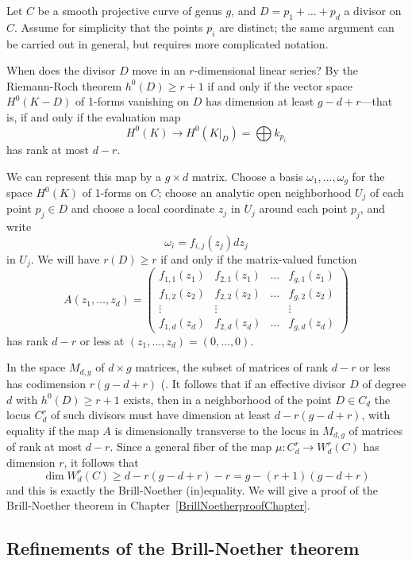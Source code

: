 Let $C$ be a smooth projective curve of genus $g$, and $D = p_1 + \dots + p_d$ a divisor on $C$. Assume for simplicity that  the points $p_i$ are distinct; the same argument  can be carried out in general, but requires more complicated notation.

When does the divisor $D$ move in an $r$-dimensional linear series? By the Riemann-Roch theorem $h^0(D) \geq r+1$ if and only if the vector space $H^0(K-D)$ of 1-forms vanishing on $D$ has dimension at least $g-d+r$---that is, if and only if the  evaluation map
$$
H^0(K) \to H^0(K|_D) = \bigoplus k_{p_i}
$$
has rank at most $d-r$. 

We can represent this map by a $g \times d$ matrix. Choose a basis $\omega_1,\dots,\omega_g$ for the space $H^0(K)$ of 1-forms on $C$; choose an analytic open neighborhood $U_j$ of each point $p_j \in D$ and choose a local coordinate $z_j$ in $U_j$ around each point $p_j$, and write
$$
\omega_i = f_{i,j}(z_j)dz_j
$$
in $U_j$. We will have $r(D) \geq r$ if and only if the  matrix-valued function
$$
A(z_1,\dots,z_d) = 
\begin{pmatrix}
f_{1,1}(z_1) & f_{2,1}(z_1) & \dots & f_{g,1}(z_1) \\
f_{1,2}(z_2) & f_{2,2}(z_2) & \dots & f_{g,2}(z_2) \\
\vdots & \vdots &  & \vdots \\
f_{1,d}(z_d) & f_{2,d}(z_d) & \dots & f_{g,d} (z_d)
\end{pmatrix}
$$
has rank $d-r$ or less at $(z_1,\dots,z_d) = (0,\dots,0)$.


In the space $M_{d,g}$ of $d \times g$ matrices, the subset of matrices of rank $d-r$ or less has codimension $r(g-d+r)$ (\cite[Exercise 10.9]{Eisenbud1995}. 
It follows 
that if  an effective divisor $D$ of degree $d$ with $h^0(D) \geq r+1$ exists, then in a neighborhood of the point $D \in C_d$ the locus $C^r_d$ of such divisors must have dimension at least $d - r(g-d+r)$, with equality if the map $A$ is dimensionally transverse to the locus in $M_{d,g}$ of matrices of rank at most $d-r$. Since a general fiber of the map $\mu : C^r_d \to W^r_d(C)$ has dimension $r$, it follows that 
$$
\dim W^r_d(C) \geq d - r(g-d+r) - r = g - (r+1)(g-d+r)
$$
and this is exactly the  Brill-Noether (in)equality. We will give a proof of the Brill-Noether theorem in Chapter~\ref{BrillNoetherproofChapter}.


\subsection{Refinements of the Brill-Noether theorem}

